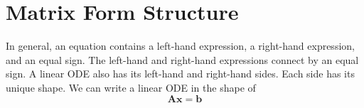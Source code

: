 

\section{Matrix Form Structure}
In general, an equation contains a left-hand expression, a right-hand expression, and an equal sign. The left-hand and right-hand expressions connect by an equal sign. A linear ODE also has its left-hand and right-hand sides. Each side has its unique shape. We can write a linear ODE in the shape of
\begin{equation} \label{eq_matrixform}
	\boldsymbol{Ax} = \boldsymbol{b}
\end{equation}

